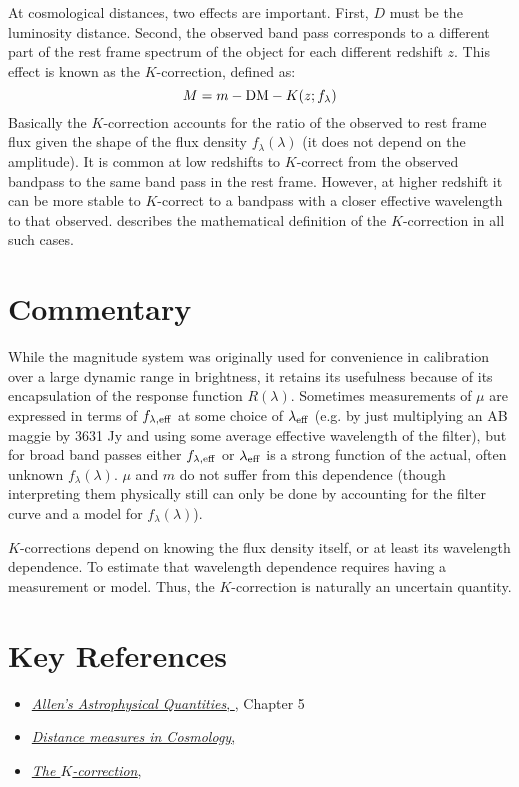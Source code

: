 At cosmological distances, two effects are important. First, $D$ must
be the luminosity distance. Second, the observed band pass corresponds
to a different part of the rest frame spectrum of the object for each
different redshift $z$. This effect is known as the $K$-correction,
defined as:
\begin{equation}
M = m - {\rm DM} - K(z; f_\lambda)
\end{equation}
Basically the $K$-correction accounts for the ratio of the observed to
rest frame flux given the shape of the flux density
$f_\lambda(\lambda)$ (it does not depend on the amplitude). It is
common at low redshifts to $K$-correct from the observed bandpass to
the same band pass in the rest frame. However, at higher redshift it
can be more stable to $K$-correct to a bandpass with a closer
effective wavelength to that observed. \citet{hogg02c} describes the
mathematical definition of the $K$-correction in all such cases. 

\section{Commentary}

While the magnitude system was originally used for convenience in
calibration over a large dynamic range in brightness, it retains its
usefulness because of its encapsulation of the response function
$R(\lambda)$.  Sometimes measurements of $\mu$ are expressed in terms
of $f_{\lambda, {\rm eff}}$ at some choice of $\lambda_{\rm eff}$
(e.g. by just multiplying an AB maggie by 3631 Jy and using some
average effective wavelength of the filter), but for broad band passes
either $f_{\lambda, {\rm eff}}$ or $\lambda_{\rm eff}$ is a strong
function of the actual, often unknown $f_\lambda(\lambda)$. $\mu$ and
$m$ do not suffer from this dependence (though interpreting them
physically still can only be done by accounting for the filter curve
and a model for $f_\lambda(\lambda)$).

$K$-corrections depend on knowing the flux density itself, or at least
its wavelength dependence. To estimate that wavelength dependence
requires having a measurement or model. Thus, the $K$-correction is
naturally an uncertain quantity.

\section{Key References}

\begin{itemize}
  \item
    \href{http://adsabs.harvard.edu/abs/2000asqu.book.....C}{
    {\it Allen's Astrophysical Quantities},
      \citet{cox00a}}, Chapter 5
  \item
    \href{http://adsabs.harvard.edu/abs/1999astro.ph..5116H}{
    {\it Distance measures in Cosmology},
      \citet{hogg99cosm}}
  \item
    \href{http://adsabs.harvard.edu/abs/2002astro.ph.10394H}{
    {\it The $K$-correction},
      \citet{hogg02c}}
\end{itemize}

